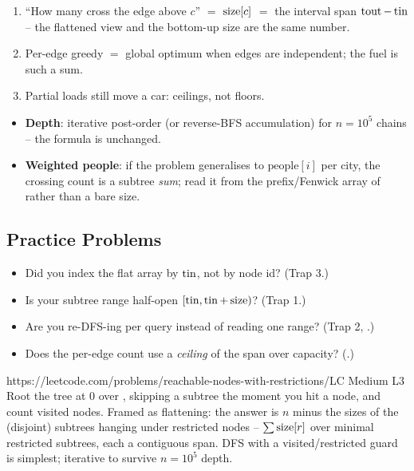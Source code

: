 \begin{insightbox}
\begin{enumerate}[nosep, leftmargin=1.6em]
  \item ``How many cross the edge above $c$'' $=$ $\operatorname{size}[c]$ $=$ the interval span
        $\operatorname{tout}-\operatorname{tin}$ -- the flattened view and the bottom-up size are the same number.
  \item Per-edge greedy $=$ global optimum when edges are independent; the fuel is such a
        sum.
  \item Partial loads still move a car: ceilings, not floors.
\end{enumerate}
\end{insightbox}

\begin{hardeningbox}
\begin{itemize}[nosep, leftmargin=1.4em]
  \item \textbf{Depth}: iterative post-order (or reverse-BFS accumulation) for $n=10^5$
        chains -- the formula is unchanged.
  \item \textbf{Weighted people}: if the problem generalises to $\text{people}[i]$ per city,
        the crossing count is a subtree \emph{sum}; read it from the prefix/Fenwick array of
         rather than a bare size.
\end{itemize}
\end{hardeningbox}

\subsection{Practice Problems}

\begin{stuckbox}
\begin{itemize}[nosep, leftmargin=1.4em]
  \item Did you index the flat array by $\operatorname{tin}$, not by node id? (Trap 3.)
  \item Is your subtree range half-open $[\operatorname{tin}, \operatorname{tin}{+}\operatorname{size})$? (Trap 1.)
  \item Are you re-DFS-ing per query instead of reading one range? (Trap 2,
        .)
  \item Does the per-edge count use a \emph{ceiling} of the span over capacity?
        (.)
\end{itemize}
\end{stuckbox}

\begin{practiceset}
    {https://leetcode.com/problems/reachable-nodes-with-restrictions/}{LC Medium L3}
    {Root the tree at $0$ over , skipping a subtree the moment you hit a
     node, and count visited nodes. Framed as flattening: the answer is
    $n$ minus the sizes of the (disjoint) subtrees hanging under restricted nodes --
    $\sum \operatorname{size}[r]$ over minimal restricted subtrees, each a contiguous span. DFS with a
    visited/restricted guard is simplest; iterative to survive $n=10^5$ depth.}
\end{practiceset}


